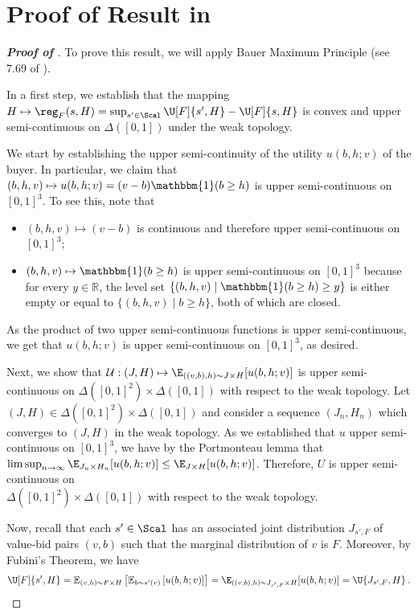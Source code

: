 \section{Proof of Result in }


\begin{proof}[\textbf{Proof of }]
To prove this result, we will apply Bauer Maximum Principle (see 7.69 of \citealt{aliprantis2006infinite}). 

In a first step, we establish that the mapping $H \mapsto \reg_F(s,H) = \sup_{s' \in \Scal} \U[F]{s',H} - \U[F]{s,H}$ is convex and upper semi-continuous on $\Delta([0,1])$ under the weak topology.

We start by establishing the upper semi-continuity of the utility $u(b,h;v)$ of the buyer. In particular, we claim that $(b,h, v) \mapsto u(b,h;v) = (v - b) \mathbbm{1}(b \geq h)$ is upper semi-continuous on $[0,1]^3$. To see this, note that
	\begin{itemize}
		\item $(b,h,v) \mapsto (v-b)$ is continuous and therefore upper semi-continuous on $[0,1]^3$;
		\item $(b,h,v) \mapsto \mathbbm{1}(b \geq h)$ is upper semi-continuous on $[0,1]^3$ because for every $y \in \mathbb{R}$, the level set $\{(b,h,v) \mid \mathbbm{1}(b \geq h) \geq y\}$ is either empty or equal to $\{(b,h,v) \mid b \geq h\}$, both of which are closed.
	\end{itemize} 
	As the product of two upper semi-continuous functions is upper semi-continuous, we get that $u(b,h;v)$ is upper semi-continuous on $[0,1]^3$, as desired.
	
	Next, we show that $\mathcal{U}: (J,H) \mapsto  \E_{((v,b), h) \sim J \times H}[u(b,h;v)]$ is upper semi-continuous on $\Delta([0,1]^2) \times \Delta([0,1])$ with respect to the weak topology. Let $(J,H) \in \Delta([0,1]^2) \times \Delta([0,1])$ and consider a sequence $(J_n, H_n)$ which converges to $(J,H)$ in the weak topology. As we established that $u$ upper semi-continuous on $[0,1]^3$, we have by the Portmonteau lemma that $\limsup_{n \to \infty} \E_{J_n \times H_n}[u(b,h;v)] \leq \E_{J \times H}[u(b,h;v)]$. Therefore, $U$ is upper semi-continuous on\\ ${\Delta([0,1]^2) \times \Delta([0,1])}$ with respect to the weak topology.
	
	Now, recall that each $s' \in \Scal$ has an associated joint distribution $J_{s',F}$ of value-bid pairs $(v,b)$ such that the marginal distribution of $v$ is $F$. Moreover, by Fubini's Theorem, we have
	\begin{align*}
		\U[F]{s',H} = \mathbb{E}_{(v, h) \sim F \times H}  \left[ \mathbb{E}_{b \sim s'(v)} \left[ u(b,h;v) \right] \right] = \E_{((v,b), h) \sim J_{s',F} \times H}[u(b,h;v)] = \U{J_{s',F},H}\,.
	\end{align*}
	

\end{proof}
